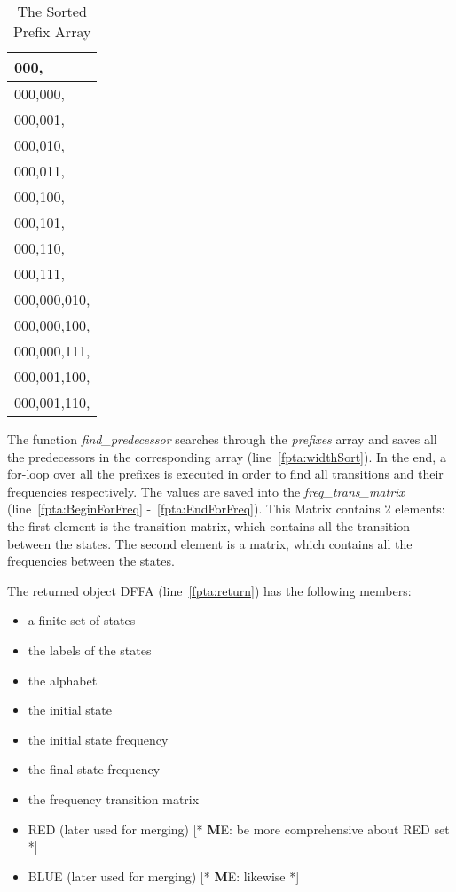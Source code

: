 \documentclass[
a4paper,     %
12pt         %
]{scrartcl}  %
\newcommand\me[1]{ [* {\textbf ME:} #1 *]}
\begin{document}
\begin{table}[ht!]
\centering
\begin{tabular}{|l|}
\hline
000,         \\ \hline
000,000,     \\ \hline
000,001,     \\ \hline
000,010,     \\ \hline
000,011,     \\ \hline
000,100,     \\ \hline
000,101,     \\ \hline
000,110,     \\ \hline
000,111,     \\ \hline
000,000,010, \\ \hline
000,000,100, \\ \hline
000,000,111, \\ \hline
000,001,100, \\ \hline
000,001,110, \\ \hline
\end{tabular}
\caption{The Sorted Prefix Array}
\label{table:sortPrefix}
\end{table}

The function \emph{find\_predecessor} searches through the \emph{prefixes} array and saves all the predecessors in the corresponding array (line~\ref{fpta:widthSort}). In the end, a for-loop over all the prefixes is executed in order to find all transitions and their frequencies respectively. The values are saved into the \emph{freq\_trans\_matrix}  (line~\ref{fpta:BeginForFreq} -~\ref{fpta:EndForFreq}). This Matrix contains 2 elements: the first element is the transition matrix, which contains all the transition between the states. The second element is a matrix, which contains all the frequencies between the states.

The returned object DFFA (line~\ref{fpta:return}) has the following members:
\begin{itemize}
      \item a finite set of states
      \item the labels of the states
      \item the alphabet
      \item the initial state
      \item the initial state frequency
      \item the final state frequency
      \item the frequency transition matrix
      \item RED (later used for merging) \me{be more comprehensive about RED set}
      \item BLUE (later used for merging) \me{likewise}
   \end{itemize}
\end{document}
